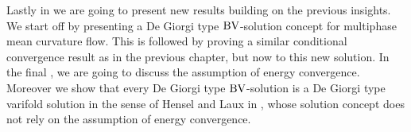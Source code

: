 Lastly in  we are going to present new results 
building on the previous insights. We start off by presenting a De Giorgi type 
$ \operatorname{BV} $-solution concept for multiphase mean curvature flow. This is followed 
by proving a similar conditional convergence result as in the previous chapter, 
but now to this new solution. In the final 
, we are going to 
discuss the assumption of energy convergence. Moreover we show that every De 
Giorgi type $ \operatorname{BV} $-solution is a De Giorgi type varifold solution in the sense 
of Hensel and Laux in 
\cite{hensel_laux_varifold_solution_concept_for_mean_curvature_flow}, whose 
solution concept does not rely on the assumption of energy convergence.



